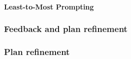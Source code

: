 \paragraph{Least-to-Most Prompting}
\label{par:least-to-most}
\lipsum[1]

\subsubsection{Feedback and plan refinement}
\label{subsubsec:feedback}
\lipsum[1]

\subsubsection{Plan refinement}
\label{subsubsec:plan-refinement}
\lipsum[1]

